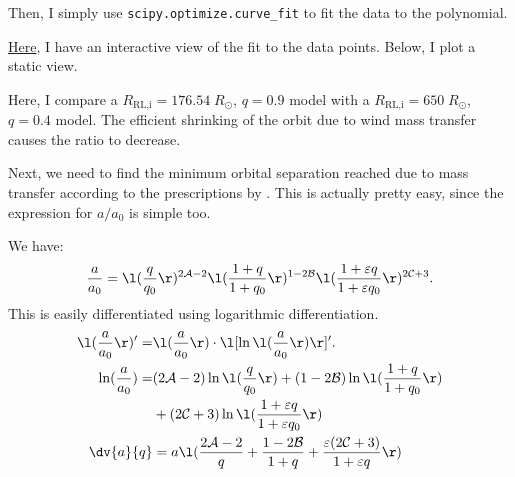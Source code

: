 \documentclass[a4paper,10pt]{article}
\begin{document}
Then, I simply use \lstinline[style=output, breaklines=true]|scipy.optimize.curve_fit| to fit the data to the polynomial.

\href{https://s-koen.github.io/figures/#/plots/master-internship/w17/fit-surface-low}{Here}, I have an interactive view of the fit to the data points. Below, I plot a static view.

\begin{figure}[ht]
    \centering
\end{figure}
Here, I compare a \(R_\text{RL,i}=176.54\;R_\odot \), \(q=0.9\) model with a \(R_\text{RL,i}=650\;R_\odot \), \(q=0.4\) model. The efficient shrinking of the orbit due to wind mass transfer causes the ratio to decrease.
\begin{figure}[ht]
    \centering
\end{figure}

Next, we need to find the minimum orbital separation reached due to mass transfer according to the prescriptions by \citet{soberman1997}. This is actually pretty easy, since the expression for \(a/ a_{0}\) is simple too.

We have:
\begin{equation*}
    \frac{a}{a_{0} } = \l(\frac{q}{q_{0}}\r)^{2 \mathcal{A} - 2} \l(\frac{1+q}{1+q_{0} }\r)^{1-2 \mathcal{B} } \l(\frac{1 + \varepsilon q}{1 + \varepsilon q_{0} }\r)^{2 \mathcal{C}  +3}   .
\end{equation*}
This is easily differentiated using logarithmic differentiation.
\begin{align*}
    \l(\frac{a}{a_{0} }\r)' =&  \l(\frac{a}{a_{0} }\r) \cdot \l[\ln \l(\frac{a}{a_{0} }\r)\r] '.\\
    \ln (\frac{a}{a_{0} }) =& (2 \mathcal{A} - 2)\ln \l(\frac{q}{q_{0}}\r) + (1 - 2 \mathcal{B} )\ln \l(\frac{1+q}{1+q_{0}}\r)\\&+(2 \mathcal{C} +3)\ln \l(\frac{1+ \varepsilon  q}{1+ \varepsilon  q_{0}}\r)\\
    \dv{a}{q} &= a \l(\frac{2 \mathcal{A}  - 2}{q} + \frac{1 - 2 \mathcal{B} }{1+q} + \frac{\varepsilon (2 \mathcal{C} + 3)}{1+ \varepsilon q}\r) 
\end{align*}
\end{document}

